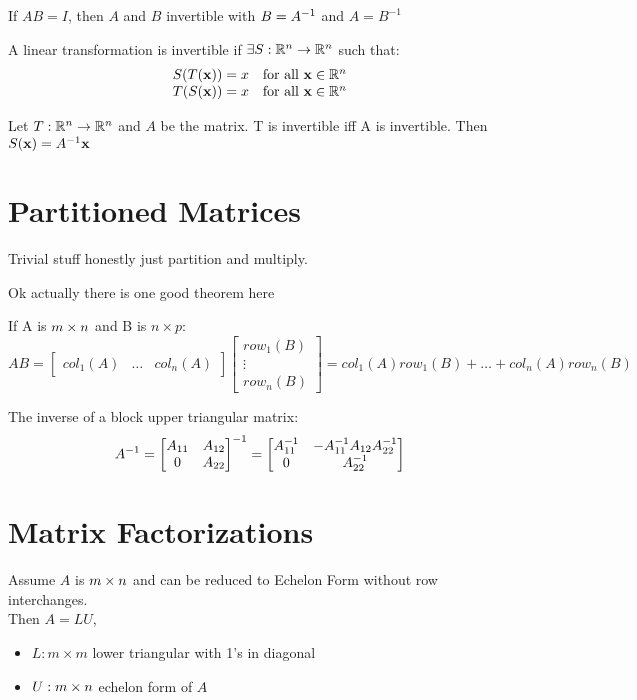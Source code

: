 \documentclass{report}
\begin{document}
If $AB = I$, then $A$ and $B$ invertible with $B = A^{-1}$ and $A = B^{-1}$

A linear transformation is invertible if $\exists S: \mathbb{R}^n \to \mathbb{R}^n$ such that:
\[
\begin{array}{rlr}
    S(T(\mathbf{x})) = x & \text{for all } \mathbf{x} \in \mathbb{R}^n \\
    T(S(\mathbf{x})) = x & \text{for all } \mathbf{x} \in \mathbb{R}^n \\
\end{array}
\]

\begin{theorem}
    Let $T : \mathbb{R}^n \to \mathbb{R}^n$ and $A$ be the matrix. T is invertible iff A is invertible.
    Then $S(\mathbf{x}) = A^{-1} \mathbf{x} $
\end{theorem}

\section{Partitioned Matrices}

Trivial stuff honestly just partition and multiply.

Ok actually there is one good theorem here
\begin{theorem}\end{theorem}
If A is $m \times n$ and B is $n \times p$:
\[
AB = \begin{bmatrix}col_1(A) & \ldots & col_n(A)\end{bmatrix} \begin{bmatrix}row_1(B) \\ \vdots \\ row_n(B)\end{bmatrix} = col_1(A) row_1(B) + \ldots + col_n(A) row_n(B) 
\]

The inverse of a block upper triangular matrix:
\[
A^{-1} = \begin{bmatrix}
    A_{11} & A_{12} \\
    0 & A_{22}
\end{bmatrix}^{-1} = \begin{bmatrix}
    A_{11}^{-1} & -A_{11}^{-1}A_{12}A_{22}^{-1} \\
    0 & A_{22}^{-1}
\end{bmatrix}
\]

\section{Matrix Factorizations}

Assume $A$ is $m \times n$ and can be reduced to Echelon Form without row interchanges. \\
Then $A = LU$, 
\begin{itemize}
    \item $L: m \times m$ lower triangular with 1's in diagonal
    \item $U: m \times n$ echelon form of $A$
\end{itemize} 
\end{document}

